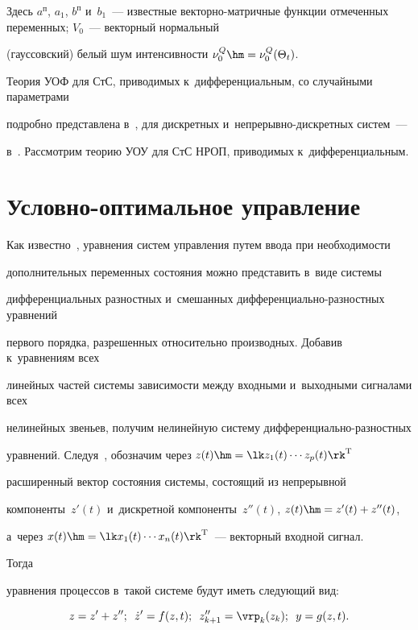 Здесь $a^{\mathrm{п}}$, $a_1$, $b^{\mathrm{п}}$ и~$b_1$~--- известные век\-тор\-но-мат\-рич\-ные функции отмеченных переменных; $V_0$~--- векторный нормальный 

(гауссовский) белый шум интенсивности $\nu_0^Q \hm= \nu_0^Q (\Theta_t)$.



Теория УОФ для СтС, приводимых к~дифференциальным, со случайными параметрами 

подробно представлена в~\cite{1-sin, 2-sin, 3-sin, 4-sin}, для дискретных и~непрерывно-дискретных сис\-тем~--- 

в~\cite{11-sin, 12-sin}. Рассмотрим теорию УОУ для СтС НРОП, приводимых к~дифференциальным.



\section{Условно-оптимальное управление}



Как известно~\cite{13-sin, 14-sin}, уравнения систем управления путем ввода при необходимости 

дополнительных переменных состояния можно представить в~виде системы 

дифференциальных разностных и~смешанных диф\-фе\-рен\-ци\-аль\-но-раз\-ност\-ных уравнений 

первого порядка, разрешенных относительно производных. Добавив к~уравнениям всех 

линейных частей сис\-те\-мы зависимости между входными и~выходными сигналами всех 

нелинейных звеньев, получим нелинейную сис\-те\-му диф\-фе\-рен\-ци\-аль\-но-раз\-ност\-ных 

уравнений. Следуя~\cite{11-sin, 12-sin, 13-sin, 14-sin}, обозначим через  $z(t) \hm=\lk z_1 (t) \cdots z_p (t)\rk^{\mathrm{T}}$ 

расширенный вектор состояния сис\-те\-мы, состоящий из непрерывной 

компоненты~$z'(t)$ и~дискретной компоненты~$z''(t)$, $z(t)\hm= z'(t) + z''(t)$, 

а~через  $x(t)\hm = \lk x_1(t) \cdots x_n(t)\rk^{\mathrm{T}}$~--- векторный входной сигнал. 



Тогда 

уравнения процессов в~такой сис\-те\-ме будут иметь следующий вид:

 \begin{equation}

 z=z'+z''; \enskip \dot z' = f(z,t);\enskip z_{k+1}'' = \vrp_k (z_k); 

\enskip y = g(z,t).\label{e4.1-sin}

\end{equation}

